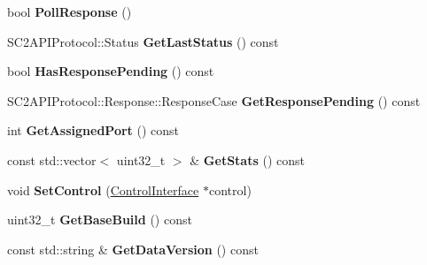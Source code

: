 \begin{DoxyCompactItemize}
bool {\bfseries Poll\+Response} ()
\item 
\mbox{\label{classsc2_1_1_proto_interface_a4fe3b76cf6a174189f41e81718c9c0bf}} 
S\+C2\+A\+P\+I\+Protocol\+::\+Status {\bfseries Get\+Last\+Status} () const
\item 
\mbox{\label{classsc2_1_1_proto_interface_a3480b4687b57ea0feea2bb158cc56c13}} 
bool {\bfseries Has\+Response\+Pending} () const
\item 
\mbox{\label{classsc2_1_1_proto_interface_a398e9c12408ee8bc45b3fc7c9849fa31}} 
S\+C2\+A\+P\+I\+Protocol\+::\+Response\+::\+Response\+Case {\bfseries Get\+Response\+Pending} () const
\item 
\mbox{\label{classsc2_1_1_proto_interface_a245d66808a9d6ac07eaa167c696ef8ac}} 
int {\bfseries Get\+Assigned\+Port} () const
\item 
\mbox{\label{classsc2_1_1_proto_interface_a3133ff62318eaf7109c161b21bab4174}} 
const std\+::vector$<$ uint32\+\_\+t $>$ \& {\bfseries Get\+Stats} () const
\item 
\mbox{\label{classsc2_1_1_proto_interface_a5f19f76c2c0c212841b934a151ac43b9}} 
void {\bfseries Set\+Control} (\hyperlink{classsc2_1_1_control_interface}{Control\+Interface} $\ast$control)
\item 
\mbox{\label{classsc2_1_1_proto_interface_a2295d11818a07258c87c4d94af8fa364}} 
uint32\+\_\+t {\bfseries Get\+Base\+Build} () const
\item 
\mbox{\label{classsc2_1_1_proto_interface_a2f3ee8353ae1ff9db5cb06f83796f854}} 
const std\+::string \& {\bfseries Get\+Data\+Version} () const
\end{DoxyCompactItemize}

